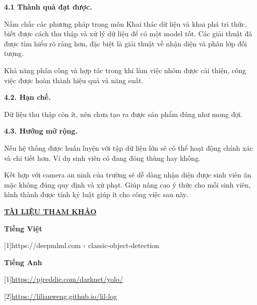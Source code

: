 \documentclass{report}
\begin{document}
%
\bigskip
\changefontsizes{14pt}
\setlength{\parindent}{0.0cm}
\textbf{4.1 Thành quả đạt được.}

\smallskip
\changefontsizes{13pt}
\setlength{\parindent}{1cm}

Nắm chắc các phương pháp trong môn Khai thác dữ liệu và khai phá tri thức, biết được cách thu thập và xử lý dữ liệu để có một model tốt. Các giải thuật đã được tìm hiểu rõ ràng hơn, đặc biệt là giải thuật về nhận diện và phân lớp đối tượng.

Khả năng phân công và hợp tác trong khi làm việc nhóm được cải thiện, công việc được hoàn thành hiệu quả và năng suất.

\bigskip
\setlength{\parindent}{0.0cm}
\changefontsizes{14pt}
\textbf{4.2. Hạn chế.}

\smallskip
\changefontsizes{13pt}
\setlength{\parindent}{1cm}

Dữ liệu thu thập còn ít, nên chưa tạo ra được sản phẩm đúng như mong đợi.

\bigskip
\setlength{\parindent}{0.0cm}
\changefontsizes{14pt}
\textbf{4.3. Hướng mở rộng.}

\smallskip
\changefontsizes{13pt}
\setlength{\parindent}{1cm}

Nếu hệ thống được huấn luyện với tập dữ liệu lớn sẽ có thể hoạt động chính xác và chi tiết hơn. Ví dụ sinh viên có đang đóng thùng hay không.

Kết hợp với camera an ninh của trường sẽ dễ dàng nhận diện được sinh viên ăn mặc không đúng quy định và xử phạt. Giúp nâng cao ý thức cho mỗi sinh viên, hình thành được tính kỷ luật giúp ít cho công việc sau này.


%




\newpage
\changefontsizes{16pt}
\centerline{\textbf{\hyperlink{page.7}{TÀI LIỆU THAM KHẢO}}}

\vspace{1.2cm}
\changefontsizes{14pt}
\setlength{\parindent}{0cm}
\textbf{Tiếng Việt}

\bigskip
\changefontsizes{13pt}
\setlength{\parindent}{1cm}



[1]https://deepmlml.com › classic-object-detection

\vspace{3cm}
\changefontsizes{14pt}
\setlength{\parindent}{0cm}
\textbf{Tiếng Anh}


\bigskip
\changefontsizes{13pt}
\setlength{\parindent}{1cm}

[1]\url{https://pjreddie.com/darknet/yolo/}

[2]\url{https://lilianweng.github.io/lil-log}
\end{document}
